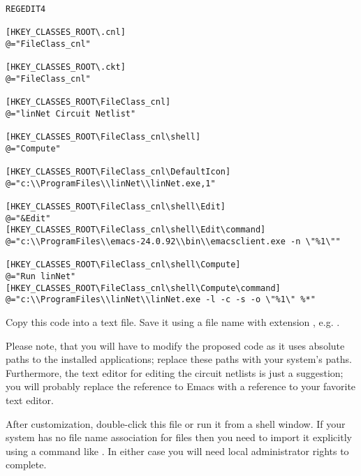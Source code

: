 \clearpage
{\footnotesize
\begin{verbatim}
REGEDIT4

[HKEY_CLASSES_ROOT\.cnl]
@="FileClass_cnl"

[HKEY_CLASSES_ROOT\.ckt]
@="FileClass_cnl"

[HKEY_CLASSES_ROOT\FileClass_cnl]
@="linNet Circuit Netlist"

[HKEY_CLASSES_ROOT\FileClass_cnl\shell]
@="Compute"

[HKEY_CLASSES_ROOT\FileClass_cnl\DefaultIcon]
@="c:\\ProgramFiles\\linNet\\linNet.exe,1"

[HKEY_CLASSES_ROOT\FileClass_cnl\shell\Edit]
@="&Edit"
[HKEY_CLASSES_ROOT\FileClass_cnl\shell\Edit\command]
@="c:\\ProgramFiles\\emacs-24.0.92\\bin\\emacsclient.exe -n \"%1\""

[HKEY_CLASSES_ROOT\FileClass_cnl\shell\Compute]
@="Run linNet"
[HKEY_CLASSES_ROOT\FileClass_cnl\shell\Compute\command]
@="c:\\ProgramFiles\\linNet\\linNet.exe -l -c -s -o \"%1\" %*"
\end{verbatim}
} %

Copy this code into a text file. Save it using a file name with extension
, e.g. .

Please note, that you will have to modify the proposed code as it uses
absolute paths to the installed applications; replace these paths with
your system's paths. Furthermore, the text editor for editing the circuit
netlists is just a suggestion; you will probably replace the reference to
Emacs with a reference to your favorite text editor.

After customization, double-click this file or run it from a shell window.
If your system has no file name association for  files then
you need to import it explicitly using a command like . In either case you will need local administrator rights
to complete.
